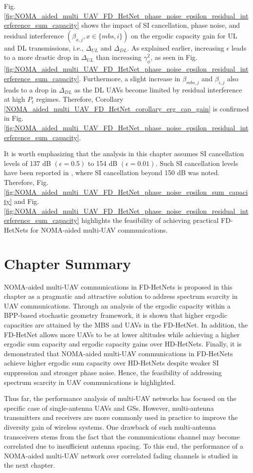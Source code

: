 Fig. \ref{fig:NOMA_aided_multi_UAV_FD_HetNet_phase_noise_epsilon_residual_interference_sum_capacity} shows the impact of SI cancellation, phase noise, and residual interference $(\beta_{x,j}, x \in \{mbs, i\})$ on the ergodic capacity gain for UL and DL transmissions, i.e., $\Delta_{UL}$ and $\Delta_{DL}$. As explained earlier, increasing $\epsilon$ leads to a more drastic drop in $\Delta_{UL}$ than increasing $\gamma_{\phi}^2$, as seen in Fig. \ref{fig:NOMA_aided_multi_UAV_FD_HetNet_phase_noise_epsilon_residual_interference_sum_capacity}. Furthermore, a slight increase in $\beta_{mbs,j}$ and $\beta_{i,j}$ also leads to a drop in $\Delta_{DL}$ as the DL UAVs become limited by residual interference at high $P_t$ regimes. Therefore, Corollary \ref{NOMA_aided_multi_UAV_FD_HetNet_corollary_erg_cap_gain} is confirmed in Fig. \ref{fig:NOMA_aided_multi_UAV_FD_HetNet_phase_noise_epsilon_residual_interference_sum_capacity}.

It is worth emphasizing that the analysis in this chapter assumes SI cancellation levels of 137 dB $(\epsilon=0.5)$ to 154 dB $(\epsilon=0.01)$. Such SI cancellation levels have been reported in \cite{choi2013simultaneous}, where SI cancellation beyond 150 dB was noted. Therefore, Fig. \ref{fig:NOMA_aided_multi_UAV_FD_HetNet_phase_noise_epsilon_sum_capacity} and Fig. \ref{fig:NOMA_aided_multi_UAV_FD_HetNet_phase_noise_epsilon_residual_interference_sum_capacity} highlights the feasibility of achieving practical FD-HetNets for NOMA-aided multi-UAV communications.

\section{Chapter Summary} \label{NOMA_aided_multi_UAV_FD_HetNet_sec_conclusion}
NOMA-aided multi-UAV communications in FD-HetNets is proposed in this chapter as a pragmatic and attractive solution to address spectrum scarcity in UAV communications. Through an analysis of the ergodic capacity within a BPP-based stochastic geometry framework, it is shown that higher ergodic capacities are attained by the MBS and UAVs in the FD-HetNet. In addition, the FD-HetNet allows more UAVs to be at lower altitudes while achieving a higher ergodic sum capacity and ergodic capacity gains over HD-HetNets. Finally, it is demonstrated that NOMA-aided multi-UAV communications in FD-HetNets achieve higher ergodic sum capacity over HD-HetNets despite weaker SI suppression and stronger phase noise. Hence, the feasibility of addressing spectrum scarcity in UAV communications is highlighted.

Thus far, the performance analysis of multi-UAV networks has focused on the specific case of single-antenna UAVs and GSs. However, multi-antenna transmitters and receivers are more commonly used in practice to improve the diversity gain of wireless systems. One drawback of such multi-antenna transceivers stems from the fact that the communications channel may become correlated due to insufficient antenna spacing. To this end, the performance of a NOMA-aided multi-UAV network over correlated fading channels is studied in the next chapter.






